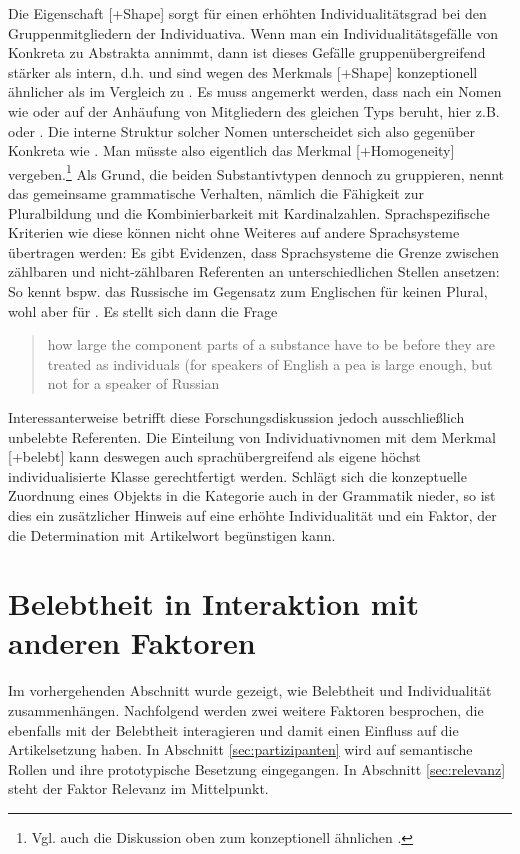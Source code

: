 Die Eigenschaft [+Shape] sorgt für einen erhöhten Individualitätsgrad bei den Gruppenmitgliedern der Individuativa. Wenn man ein Individualitätsgefälle von Konkreta zu Abstrakta annimmt, dann ist dieses Gefälle gruppenübergreifend stärker als intern, d.h.  und  sind wegen des Merkmals [+Shape] konzeptionell ähnlicher als  im Vergleich zu  . Es muss angemerkt werden, dass nach \textcite{Rijkhoff2002} ein Nomen wie  oder  auf der Anhäufung von Mitgliedern des gleichen Typs beruht, hier z.B.  oder . Die interne Struktur solcher Nomen unterscheidet sich also gegenüber  Konkreta wie . Man müsste also eigentlich das Merkmal [+Homogeneity] vergeben.\footnote{Vgl. auch die Diskussion oben zum konzeptionell ähnlichen .} Als Grund, die beiden Substantivtypen dennoch zu gruppieren, nennt \textcite[103]{Zifonun2012}  das gemeinsame grammatische Verhalten, nämlich die Fähigkeit zur Pluralbildung und die Kombinierbarkeit mit Kardinalzahlen. Sprachspezifische Kriterien wie diese können nicht ohne Weiteres auf andere Sprachsysteme übertragen werden:  Es gibt Evidenzen, dass Sprachsysteme die Grenze zwischen zählbaren und nicht-zählbaren Referenten an unterschiedlichen Stellen ansetzen: So kennt bspw. das Russische im Gegensatz zum Englischen für  keinen Plural, wohl aber für  \parencite[80]{Corbett2000}. Es stellt sich dann die Frage \blockcquote[80]{Corbett2000}{how large the component parts of a substance have to be before they are treated as individuals (for speakers of English a pea is large enough, but not for a speaker of Russian}. Interessanterweise betrifft diese Forschungsdiskussion jedoch ausschließlich unbelebte Referenten. Die Einteilung von Individuativnomen mit dem Merkmal [+belebt] kann deswegen auch sprachübergreifend als eigene höchst individualisierte Klasse gerechtfertigt werden. Schlägt sich die konzeptuelle Zuordnung eines Objekts in die Kategorie  auch in der Grammatik nieder, so ist dies ein zusätzlicher Hinweis auf eine erhöhte Individualität und ein Faktor, der die Determination mit Artikelwort begünstigen kann. 

\section{Belebtheit in Interaktion mit anderen Faktoren} \label{sec:andere-kog}
 
Im vorhergehenden Abschnitt wurde gezeigt, wie Belebtheit und Individualität zusammenhängen. Nachfolgend werden zwei weitere Faktoren besprochen, die ebenfalls mit der Belebtheit interagieren und damit einen Einfluss auf die Artikelsetzung haben. In Abschnitt \ref{sec:partizipanten} wird auf semantische Rollen und ihre prototypische Besetzung eingegangen. In Abschnitt \ref{sec:relevanz} steht der Faktor Relevanz im Mittelpunkt.
 
